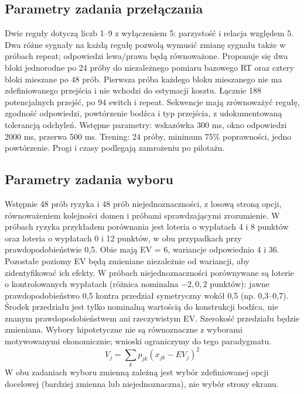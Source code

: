 \documentclass[11pt,a4paper]{article}
\begin{document}
\subsection{Parametry zadania przełączania}
Dwie reguły dotyczą liczb 1--9 z wyłączeniem 5: parzystość i relacja względem 5. Dwa różne sygnały na każdą regułę pozwolą wymusić zmianę sygnału także w próbach repeat; odpowiedzi lewa/prawa będą równoważone. Proponuje się dwa bloki jednorodne po 24 próby do niezależnego pomiaru bazowego RT oraz cztery bloki mieszane po 48 prób. Pierwsza próba każdego bloku mieszanego nie ma zdefiniowanego przejścia i nie wchodzi do estymacji kosztu. Łącznie 188 potencjalnych przejść, po 94 switch i repeat. Sekwencje mają zrównoważyć regułę, zgodność odpowiedzi, powtórzenie bodźca i typ przejścia, z udokumentowaną tolerancją odchyleń. Wstępne parametry: wskazówka 300 ms, okno odpowiedzi 2000 ms, przerwa 500 ms. Trening: 24 próby, minimum 75\% poprawności, jedno powtórzenie. Progi i czasy podlegają zamrożeniu po pilotażu.

\subsection{Parametry zadania wyboru}
Wstępnie 48 prób ryzyka i 48 prób niejednoznaczności, z losową stroną opcji, równoważeniem kolejności domen i próbami sprawdzającymi zrozumienie. W próbach ryzyka przykładem porównania jest loteria o wypłatach 4 i 8 punktów oraz loteria o wypłatach 0 i 12 punktów, w obu przypadkach przy prawdopodobieństwie 0,5. Obie mają EV = 6, wariancje odpowiednio 4 i 36. Pozostałe poziomy EV będą zmieniane niezależnie od wariancji, aby zidentyfikować ich efekty. W próbach niejednoznaczności porównywane są loterie o kontrolowanych wypłatach (różnica nominalna $-2,0,2$ punktów): jawne prawdopodobieństwo 0,5 kontra przedział symetryczny wokół 0,5 (np. 0,3--0,7). Środek przedziału jest tylko nominalną wartością do konstrukcji bodźca, nie znanym prawdopodobieństwem ani rzeczywistym EV. Szerokość przedziału będzie zmieniana. Wybory hipotetyczne nie są równoznaczne z wyborami motywowanymi ekonomicznie; wnioski ograniczymy do tego paradygmatu.
\begin{equation}
V_j=\sum_k p_{jk}(x_{jk}-EV_j)^2
\end{equation}
W obu zadaniach wyboru zmienną zależną jest wybór zdefiniowanej opcji docelowej (bardziej zmienna lub niejednoznaczna), nie wybór strony ekranu.
\end{document}
